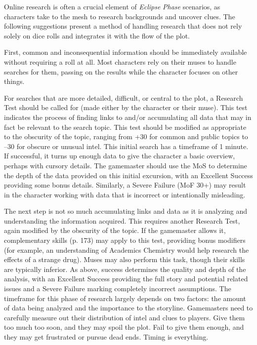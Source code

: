 Online research is often a crucial element of \textit{Eclipse }
\textit{Phase} scenarios, as characters take to the mesh to 
research backgrounds and uncover clues. The following
suggestions present a method of handling research
that does not rely solely on dice rolls and integrates it 
with the flow of the plot.

First, common and inconsequential information 
should be immediately available without requiring 
a roll at all. Most characters rely on their muses to 
handle searches for them, passing on the results while 
the character focuses on other things.

For searches that are more detailed, difficult, or 
central to the plot, a Research Test should be called 
for (made either by the character or their muse). 
This test indicates the process of finding links to 
and/or accumulating all data that may in fact be 
relevant to the search topic. This test should be 
modified as appropriate to the obscurity of the topic, 
ranging from +30 for common and public topics 
to –30 for obscure or unusual intel. This initial 
search has a timeframe of 1 minute. If successful, it 
turns up enough data to give the character a basic 
overview, perhaps with cursory details. The gamemaster
should use the MoS to determine the depth
of the data provided on this initial excursion, with 
an Excellent Success providing some bonus details. 
Similarly, a Severe Failure (MoF 30+) may result in 
the character working with data that is incorrect or 
intentionally misleading.

The next step is not so much accumulating links 
and data as it is analyzing and understanding the 
information acquired. This requires another Research
Test, again modified by the obscurity of the
topic. If the gamemaster allows it, complementary 
skills (p. 173) may apply to this test, providing bonus 
modifiers (for example, an understanding of Academics
Chemistry would help research the effects of a
strange drug). Muses may also perform this task, 
though their skills are typically inferior. As above, 
success determines the quality and depth of the 
analysis, with an Excellent Success providing the full 
story and potential related issues and a Severe Failure
marking completely incorrect assumptions. The
timeframe for this phase of research largely depends 
on two factors: the amount of data being analyzed 
and the importance to the storyline. Gamemasters 
need to carefully measure out their distribution of 
intel and clues to players. Give them too much too 
soon, and they may spoil the plot. Fail to give them 
enough, and they may get frustrated or pursue dead 
ends. Timing is everything.

